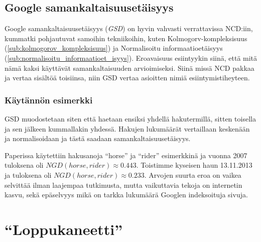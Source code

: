 \documentclass[12pt,finnish]{tktltiki2}
\theoremstyle{definition}
\theoremstyle{remark}
\begin{document}
  \subsection{Google samankaltaisuusetäisyys} %
  \label{sub:google_similarity_distance}
    Google samankaltaisuusetäisyys (\emph{GSD}) on hyvin vahvasti verrattavissa NCD:iin, kummatki pohjautuvat samoihin tekniikoihin, kuten Kolmogorv-kompleksisuus (\ref{sub:kolmogorov_kompleksisuus}) ja Normalisoitu informaatioetäisyys (\ref{sub:normalisoitu_informaatioet_isyys}).
    Eroavaisuus esiintyykin siinä, että mitä nämä kaksi käyttävät samankaltaisuuden arvioimiseksi.
    Siinä missä NCD pakkaa ja vertaa sisältöä toisiinsa, niin GSD vertaa asioitten nimiä esiintymistiheyteen.

    \subsubsection{Käytännön esimerkki} %
    \label{ssub:k_yt_nn_n_esimerkki}
      GSD muodostetaan siten että haetaan ensiksi yhdellä hakutermillä, sitten toisella ja sen jälkeen kummallakin yhdessä.
      Hakujen lukumäärät vertaillaan keskenään ja normalisoidaan ja tästä saadaan samankaltaisuusetäisyys.

      Paperissa \cite{cilibrasi2007google} käytettiin hakusanoja ``horse'' ja ``rider'' esimerkkinä ja vuonna 2007 tuloksena oli $NGD(horse, rider) \approx 0.443$.
      Toistimme kyseisen haun 13.11.2013 ja tuloksena oli $NGD(horse, rider) \approx 0.233$.
      Arvojen suurta eroa on vaikea selvittää ilman laajempaa tutkimusta, mutta vaikuttavia tekoja on internetin kasvu, sekä epäselvyys mikä on tarkka lukumäärä Googlen indeksoituja sivuja.





\section{``Loppukaneetti''} %
\label{sec:loppukaneetti}


\pagebreak
%
%

%

% 





%
\end{document}
